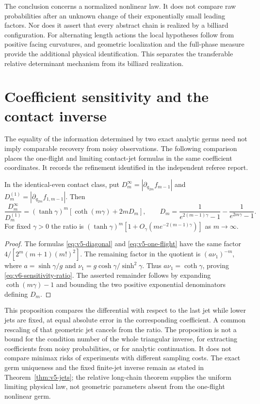The conclusion concerns a normalized nonlinear law. It does not compare
raw probabilities after an unknown change of their exponentially small
leading factors. Nor does it assert that every abstract chain is realized
by a billiard configuration. For alternating length actions the local
hypotheses follow from positive facing curvatures, and geometric
localization and the full-phase measure provide the additional physical
identification. This separates the transferable relative determinant
mechanism from its billiard realization.

\section{Coefficient sensitivity and the contact inverse}
\label{sec:v6-sensitivity}
The equality of the information determined by two exact analytic germs
need not imply comparable recovery from noisy observations. The
following comparison places the one-flight and limiting contact-jet
formulas in the same coefficient coordinates. It records the refinement
identified in the independent referee report.

\begin{proposition}
\label{prop:v6-sensitivity}
In the identical-even contact class, put
$D_m^\infty=|\partial_{q_{2m}}f_{m-1}|$ and
$D_m^{(1)}=|\partial_{q_{2m}}f_{1,m-1}|$. Then
\begin{equation}\label{eq:v6-sensitivity-ratio}
 \frac{D_m^\infty}{D_m^{(1)}}
 =(\tanh\gamma)^m\left[\coth(m\gamma)+2mD_m\right],\qquad
 D_m=\frac1{e^{2(m-1)\gamma}-1}-\frac1{e^{2m\gamma}-1}.
\end{equation}
For fixed $\gamma>0$ the ratio is
$(\tanh\gamma)^m[1+O_\gamma(m e^{-2(m-1)\gamma})]$ as $m\to\infty$.
\end{proposition}
\begin{proof}
The formulas \eqref{eq:v5-diagonal} and \eqref{eq:v5-one-flight}
have the same factor $4/[2^m(m+1)(m!)^2]$. The remaining factor in
the quotient is $(a\nu_1)^{-m}$, where
$a=\sinh\gamma/g$ and $\nu_1=g\cosh\gamma/\sinh^2\gamma$.
Thus $a\nu_1=\coth\gamma$, proving
\eqref{eq:v6-sensitivity-ratio}. The asserted remainder follows by
expanding $\coth(m\gamma)-1$ and bounding the two positive exponential
denominators defining $D_m$.
\end{proof}

This proposition compares the differential with respect to the last jet
while lower jets are fixed, at equal absolute error in the corresponding
coefficient. A common rescaling of that geometric jet cancels from the
ratio. The proposition is not a bound for the condition number of the
whole triangular inverse, for extracting coefficients from noisy
probabilities, or for analytic continuation. It does not compare minimax
risks of experiments with different sampling costs. The exact germ
uniqueness and the fixed finite-jet inverse remain as stated in
Theorem~\ref{thm:v5-jets}; the relative long-chain theorem supplies the
uniform limiting physical law, not geometric parameters absent from the
one-flight nonlinear germ.

